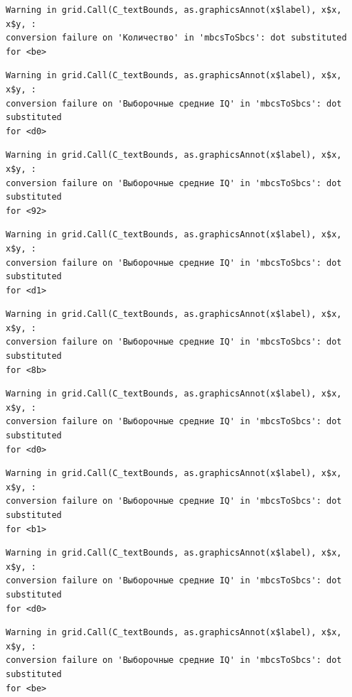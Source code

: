 \documentclass[
  letterpaper,
  DIV=11,
  numbers=noendperiod]{scrreprt}
\theoremstyle{definition}
\theoremstyle{remark}
\begin{document}
\begin{verbatim}
Warning in grid.Call(C_textBounds, as.graphicsAnnot(x$label), x$x, x$y, :
conversion failure on 'Количество' in 'mbcsToSbcs': dot substituted for <be>
\end{verbatim}

\begin{verbatim}
Warning in grid.Call(C_textBounds, as.graphicsAnnot(x$label), x$x, x$y, :
conversion failure on 'Выборочные средние IQ' in 'mbcsToSbcs': dot substituted
for <d0>
\end{verbatim}

\begin{verbatim}
Warning in grid.Call(C_textBounds, as.graphicsAnnot(x$label), x$x, x$y, :
conversion failure on 'Выборочные средние IQ' in 'mbcsToSbcs': dot substituted
for <92>
\end{verbatim}

\begin{verbatim}
Warning in grid.Call(C_textBounds, as.graphicsAnnot(x$label), x$x, x$y, :
conversion failure on 'Выборочные средние IQ' in 'mbcsToSbcs': dot substituted
for <d1>
\end{verbatim}

\begin{verbatim}
Warning in grid.Call(C_textBounds, as.graphicsAnnot(x$label), x$x, x$y, :
conversion failure on 'Выборочные средние IQ' in 'mbcsToSbcs': dot substituted
for <8b>
\end{verbatim}

\begin{verbatim}
Warning in grid.Call(C_textBounds, as.graphicsAnnot(x$label), x$x, x$y, :
conversion failure on 'Выборочные средние IQ' in 'mbcsToSbcs': dot substituted
for <d0>
\end{verbatim}

\begin{verbatim}
Warning in grid.Call(C_textBounds, as.graphicsAnnot(x$label), x$x, x$y, :
conversion failure on 'Выборочные средние IQ' in 'mbcsToSbcs': dot substituted
for <b1>
\end{verbatim}

\begin{verbatim}
Warning in grid.Call(C_textBounds, as.graphicsAnnot(x$label), x$x, x$y, :
conversion failure on 'Выборочные средние IQ' in 'mbcsToSbcs': dot substituted
for <d0>
\end{verbatim}

\begin{verbatim}
Warning in grid.Call(C_textBounds, as.graphicsAnnot(x$label), x$x, x$y, :
conversion failure on 'Выборочные средние IQ' in 'mbcsToSbcs': dot substituted
for <be>
\end{verbatim}
\end{document}
